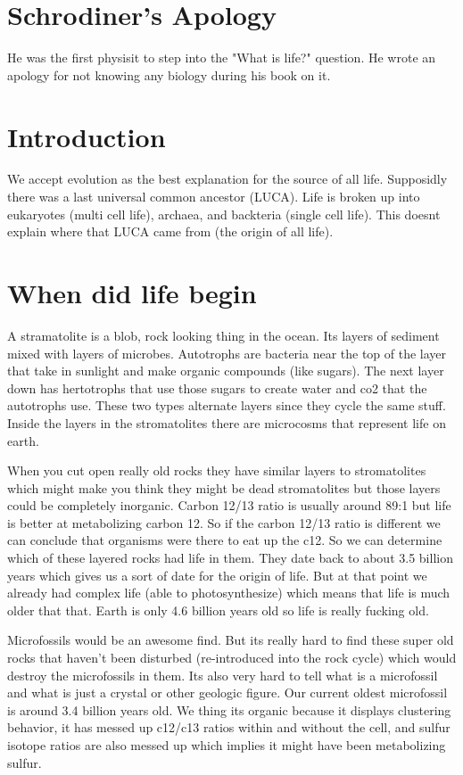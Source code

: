 \documentclass{article}
\begin{document}
\section*{Schrodiner's Apology}
\label{sec:schrodiner_s_apology}
He was the first physisit to step into the "What is life?" question. He wrote an apology for not knowing any biology during his book on it.

\section*{Introduction}
\label{sec:introduction}
We accept evolution as the best explanation for the source of all life. Supposidly there was a last universal common ancestor (LUCA). Life is broken up into eukaryotes (multi cell life), archaea, and backteria (single cell life). This doesnt explain where that LUCA came from (the origin of all life).

\section*{When did life begin}
\label{sec:when_did_life_begin}
A stramatolite is a blob, rock looking thing in the ocean. Its layers of sediment mixed with layers of microbes. Autotrophs are bacteria near the top of the layer that take in sunlight and make organic compounds (like sugars). The next layer down has hertotrophs that use those sugars to create water and co2 that the autotrophs use. These two types alternate layers since they cycle the same stuff. Inside the layers in the stromatolites there are microcosms that represent life on earth.

When you cut open really old rocks they have similar layers to stromatolites which might make you think they might be dead stromatolites but those layers could be completely inorganic. Carbon 12/13 ratio is usually around 89:1 but life is better at metabolizing carbon 12. So if the carbon 12/13 ratio is different we can conclude that organisms were there to eat up the c12. So we can determine which of these layered rocks had life in them. They date back to about 3.5 billion years which gives us a sort of date for the origin of life. But at that point we already had complex life (able to photosynthesize) which means that life is much older that that. Earth is only 4.6 billion years old so life is really fucking old.

Microfossils would be an awesome find. But its really hard to find these super old rocks that haven't been disturbed (re-introduced into the rock cycle) which would destroy the microfossils in them. Its also very hard to tell what is a microfossil and what is just a crystal or other geologic figure. Our current oldest microfossil is around 3.4 billion years old. We thing its organic because it displays clustering behavior, it has messed up c12/c13 ratios within and without the cell, and sulfur isotope ratios are also messed up which implies it might have been metabolizing sulfur.
\end{document}
